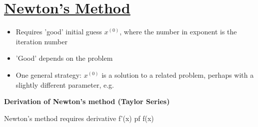 \def \secname {Newton's Method}

\section[\secname]{\hyperlink{toc}{\secname}}


\begin{itemize}
    \item Requires 'good' initial guess $x^{(0)}$, where the number in exponent is the iteration number
    \item 'Good' depends on the problem
    \item One general strategy: $x^{(0)}$ is a solution to a related problem, perhaps with a slightly different parameter, e.g.
\end{itemize}

\textbf{Derivation of Newton's method (Taylor Series)}

Newton's method requires derivative f'(x) pf f(x)

